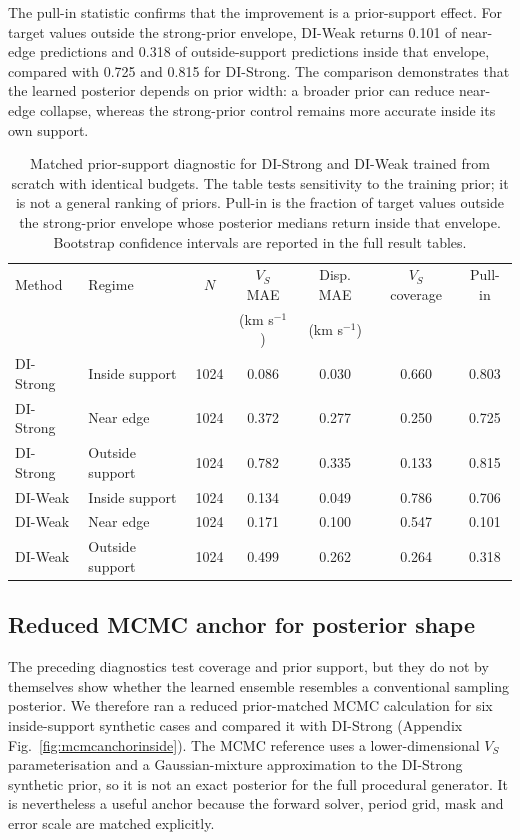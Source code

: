 \documentclass[referee]{gji}
\begin{document}
The pull-in statistic confirms that the improvement is a prior-support effect. For target values outside the strong-prior envelope, DI-Weak returns 0.101 of near-edge predictions and 0.318 of outside-support predictions inside that envelope, compared with 0.725 and 0.815 for DI-Strong. The comparison demonstrates that the learned posterior depends on prior width: a broader prior can reduce near-edge collapse, whereas the strong-prior control remains more accurate inside its own support.

\begin{table}
\caption{Matched prior-support diagnostic for DI-Strong and DI-Weak trained from scratch with identical budgets. The table tests sensitivity to the training prior; it is not a general ranking of priors. Pull-in is the fraction of target values outside the strong-prior envelope whose posterior medians return inside that envelope. Bootstrap confidence intervals are reported in the full result tables.}
\label{tab:priorboundary}
\centering
\begin{tabular}{@{}llccccc@{}}
\toprule
Method & Regime & $N$ & $V_S$ MAE & Disp. MAE & $V_S$ coverage & Pull-in \\
 & & & (km s$^{-1}$) & (km s$^{-1}$) & & \\
\midrule
DI-Strong & Inside support & 1024 & 0.086 & 0.030 & 0.660 & 0.803 \\
DI-Strong & Near edge & 1024 & 0.372 & 0.277 & 0.250 & 0.725 \\
DI-Strong & Outside support & 1024 & 0.782 & 0.335 & 0.133 & 0.815 \\
DI-Weak & Inside support & 1024 & 0.134 & 0.049 & 0.786 & 0.706 \\
DI-Weak & Near edge & 1024 & 0.171 & 0.100 & 0.547 & 0.101 \\
DI-Weak & Outside support & 1024 & 0.499 & 0.262 & 0.264 & 0.318 \\
\bottomrule
\end{tabular}
\end{table}

\subsection{Reduced MCMC anchor for posterior shape}
\label{sec:mcmc_anchor_results}

The preceding diagnostics test coverage and prior support, but they do not by themselves show whether the learned ensemble resembles a conventional sampling posterior. We therefore ran a reduced prior-matched MCMC calculation for six inside-support synthetic cases and compared it with DI-Strong (Appendix Fig.~\ref{fig:mcmcanchorinside}). The MCMC reference uses a lower-dimensional $V_S$ parameterisation and a Gaussian-mixture approximation to the DI-Strong synthetic prior, so it is not an exact posterior for the full procedural generator. It is nevertheless a useful anchor because the forward solver, period grid, mask and error scale are matched explicitly.
\end{document}
